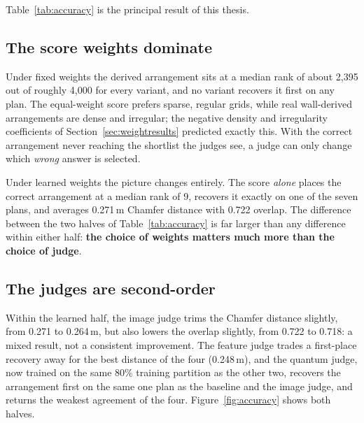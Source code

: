 Table~\ref{tab:accuracy} is the principal result of this thesis.

\begin{table}[H]
\centering
\caption[Accuracy of the four variants]{Accuracy of the four variants under
both sets of score weights, averaged over the seven evaluation plans.
Rank is the position of the derived arrangement in the variant's full
ordering of 512 to 4,000 candidates. Distance is the mean Chamfer distance
between chosen and correct columns; overlap is the proportion coinciding
within tolerance.}
\label{tab:accuracy}
\small

\end{table}

\subsection{The score weights dominate}

Under fixed weights the derived arrangement sits at a median rank of about
2,395 out of roughly 4,000 for every variant, and no variant recovers it
first on any plan. The equal-weight score prefers sparse, regular grids,
while real wall-derived arrangements are dense and irregular; the negative
density and irregularity coefficients of
Section~\ref{sec:weightresults} predicted exactly this. With the correct
arrangement never reaching the shortlist the judges see, a judge can only
change which \emph{wrong} answer is selected.

Under learned weights the picture changes entirely. The score \emph{alone}
places the correct arrangement at a median rank of 9, recovers it exactly
on one of the seven plans, and averages 0.271\,m Chamfer distance with 0.722
overlap. The difference between the two halves of
Table~\ref{tab:accuracy} is far larger than any difference within either
half: \textbf{the choice of weights matters much more than the choice of
judge}.

\subsection{The judges are second-order}

Within the learned half, the image judge trims the Chamfer distance
slightly, from 0.271 to 0.264\,m, but also lowers the overlap slightly,
from 0.722 to 0.718: a mixed result, not a consistent improvement. The
feature judge trades a first-place recovery away for the best distance of
the four (0.248\,m), and the quantum judge, now trained on the same 80\%
training partition as the other two, recovers the arrangement first on
the same one plan as the baseline and the image judge, and returns the
weakest agreement of the four. Figure~\ref{fig:accuracy} shows both
halves.

